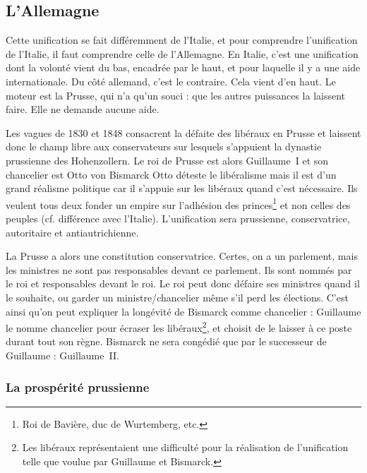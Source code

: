 \documentclass[12pt]{report}
\begin{document}
\subsection{L'Allemagne}


Cette unification se fait différemment de l’Italie, et pour comprendre l'unification de l'Italie, il faut comprendre celle de l'Allemagne.
En Italie, c'est une unification dont la volonté vient du bas, encadrée par le haut, et pour laquelle il y a une aide internationale.
Du côté allemand, c'est le contraire. Cela vient d'en haut. Le moteur est la Prusse, qui n'a qu'un souci : que les autres puissances la laissent faire. Elle ne demande aucune aide.

Les vagues de 1830 et 1848 consacrent la défaite des libéraux en Prusse et laissent donc le champ libre aux conservateurs sur lesquels s’appuient la dynastie prussienne des Hohenzollern. 
Le roi de Prusse est alors Guillaume~I et son chancelier est Otto von Bismarck
Otto déteste le libéralisme mais il est d’un grand réalisme politique car il s'appuie sur les libéraux quand c'est nécessaire.
Ils veulent tous deux fonder un empire sur l’adhésion des princes\footnote{Roi de Bavière, duc de Wurtemberg, etc.} et non celles des peuples (cf. différence avec l'Italie).
L’unification sera prussienne, conservatrice, autoritaire et antiautrichienne. 

La Prusse a alors une constitution conservatrice. 
Certes, on a un parlement, mais les ministres ne sont pas responsables devant ce parlement.
Ils sont nommés par le roi et responsables devant le roi.
Le roi peut donc défaire ses ministres quand il le souhaite, ou garder un ministre/chancelier même s'il perd les élections.
C'est ainsi qu'on peut expliquer la longévité de Bismarck comme chancelier : Guillaume le nomme chancelier pour écraser les libéraux\footnote{Les libéraux représentaient une difficulté pour la réalisation de l'unification telle que voulue par Guillaume et Bismarck.}, et choisit de le laisser à ce poste durant tout son règne.
Bismarck ne sera congédié que par le successeur de Guillaume : Guillaume~II.




\subsubsection{La prospérité prussienne}
\end{document}
